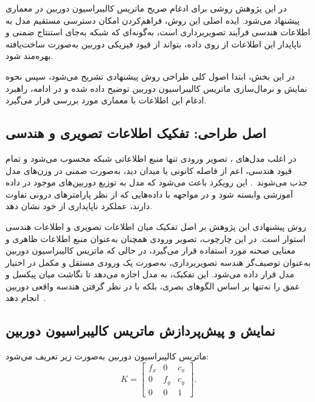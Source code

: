  در این پژوهش روشی برای ادغام صریح ماتریس کالیبراسیون دوربین در معماری  پیشنهاد می‌شود. ایده اصلی این روش، فراهم‌کردن امکان دسترسی مستقیم مدل به اطلاعات هندسی فرآیند تصویربرداری است، به‌گونه‌ای که شبکه به‌جای استنتاج ضمنی و ناپایدار این اطلاعات از روی داده، بتواند از قیود فیزیکی دوربین به‌صورت ساخت‌یافته بهره‌مند شود.


در این بخش، ابتدا اصول کلی طراحی روش پیشنهادی تشریح می‌شود، سپس نحوه نمایش و نرمال‌سازی ماتریس کالیبراسیون دوربین توضیح داده شده و در ادامه، راهبرد ادغام این اطلاعات با معماری  \basemodel{} مورد بررسی قرار می‌گیرد.

\subsection{اصل طراحی: تفکیک اطلاعات تصویری و هندسی}

در اغلب مدل‌های ، تصویر ورودی تنها منبع اطلاعاتی شبکه محسوب می‌شود و تمام قیود هندسی، اعم از فاصله کانونی یا میدان دید، به‌صورت ضمنی در وزن‌های مدل جذب می‌شوند~\cite{Zhou2017Unsupervised,Godard2019Digging}. این رویکرد باعث می‌شود که مدل به توزیع دوربین‌های موجود در داده آموزشی وابسته شود و در مواجهه با داده‌هایی که از نظر پارامترهای درونی تفاوت دارند، عملکرد ناپایداری از خود نشان دهد.

روش پیشنهادی این پژوهش بر اصل تفکیک میان اطلاعات تصویری و اطلاعات هندسی استوار است. در این چارچوب، تصویر ورودی همچنان به‌عنوان منبع اطلاعات ظاهری و معنایی صحنه مورد استفاده قرار می‌گیرد، در حالی که ماتریس کالیبراسیون دوربین به‌عنوان توصیف‌گر هندسه تصویربرداری، به‌صورت یک ورودی مستقل و مکمل در اختیار مدل قرار داده می‌شود. این تفکیک، به مدل اجازه می‌دهد تا نگاشت میان پیکسل و عمق را نه‌تنها بر اساس الگوهای بصری، بلکه با در نظر گرفتن هندسه واقعی دوربین انجام دهد~\cite{Facil2019CAMConvs,Yin2023Metric3D}.

\subsection{نمایش و پیش‌پردازش ماتریس کالیبراسیون دوربین}
\label{subsec:camera_descriptor}

ماتریس کالیبراسیون دوربین به‌صورت زیر تعریف می‌شود:
\begin{equation}
K =
\begin{bmatrix}
f_x & 0 & c_x \\
0 & f_y & c_y \\
0 & 0 & 1
\end{bmatrix}.
\end{equation}

